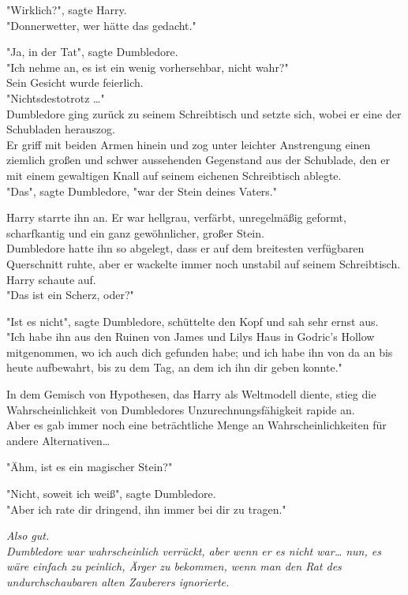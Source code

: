 {"Wirklich?", sagte Harry.\\ "Donnerwetter, wer hätte das gedacht."

"Ja, in der Tat", sagte Dumbledore.\\ "Ich nehme an, es ist ein wenig vorhersehbar, nicht wahr?"\\ Sein Gesicht wurde feierlich.\\ "Nichtsdestotrotz …"\\ Dumbledore ging zurück zu seinem Schreibtisch und setzte sich, wobei er eine der Schubladen herauszog.\\ Er griff mit beiden Armen hinein und zog unter leichter Anstrengung einen ziemlich großen und schwer aussehenden Gegenstand aus der Schublade, den er mit einem gewaltigen Knall auf seinem eichenen Schreibtisch ablegte.\\ "Das", sagte Dumbledore, "war der Stein deines Vaters."

Harry starrte ihn an. Er war hellgrau, verfärbt, unregelmäßig geformt, scharfkantig und ein ganz gewöhnlicher, großer Stein.\\ Dumbledore hatte ihn so abgelegt, dass er auf dem breitesten verfügbaren Querschnitt ruhte, aber er wackelte immer noch unstabil auf seinem Schreibtisch.\\ Harry schaute auf.\\ "Das ist ein Scherz, oder?"

"Ist es nicht", sagte Dumbledore, schüttelte den Kopf und sah sehr ernst aus.\\ "Ich habe ihn aus den Ruinen von James und Lilys Haus in Godric's Hollow mitgenommen, wo ich auch dich gefunden habe; und ich habe ihn von da an bis heute aufbewahrt, bis zu dem Tag, an dem ich ihn dir geben konnte."

In dem Gemisch von Hypothesen, das Harry als Weltmodell diente, stieg die Wahrscheinlichkeit von Dumbledores Unzurechnungsfähigkeit rapide an.\\ Aber es gab immer noch eine beträchtliche Menge an Wahrscheinlichkeiten für andere Alternativen…

"Ähm, ist es ein magischer Stein?"

"Nicht, soweit ich weiß", sagte Dumbledore.\\ "Aber ich rate dir dringend, ihn immer bei dir zu tragen."

\emph{Also gut.\\ Dumbledore war wahrscheinlich verrückt, aber wenn er es nicht war… nun, es wäre einfach zu} \emph{peinlich, Ärger zu bekommen, wenn man den Rat des undurchschaubaren alten Zauberers ignorierte.}

}
